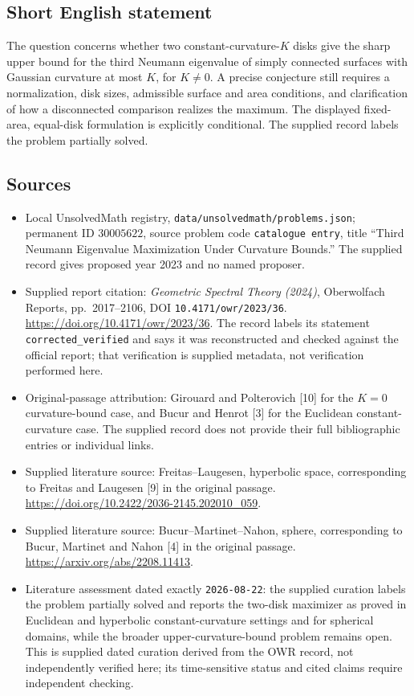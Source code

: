 \documentclass[11pt]{article}
\begin{document}
\subsection{Short English statement}
The question concerns whether two constant-curvature-\(K\) disks give the sharp upper bound for the third Neumann eigenvalue of simply connected surfaces with Gaussian curvature at most \(K\), for \(K\neq0\). A precise conjecture still requires a normalization, disk sizes, admissible surface and area conditions, and clarification of how a disconnected comparison realizes the maximum. The displayed fixed-area, equal-disk formulation is explicitly conditional. The supplied record labels the problem partially solved.
\subsection{Sources}
\begin{itemize}
\item Local UnsolvedMath registry, \texttt{data/unsolvedmath/problems.json}; permanent ID \(30005622\), source problem code \texttt{catalogue entry}, title ``Third Neumann Eigenvalue Maximization Under Curvature Bounds.'' The supplied record gives proposed year 2023 and no named proposer.
\item Supplied report citation: \emph{Geometric Spectral Theory (2024)}, Oberwolfach Reports, pp.\ 2017--2106, DOI \texttt{10.4171/owr/2023/36}. \url{https://doi.org/10.4171/owr/2023/36}. The record labels its statement \texttt{corrected\_verified} and says it was reconstructed and checked against the official report; that verification is supplied metadata, not verification performed here.
\item Original-passage attribution: Girouard and Polterovich [10] for the \(K=0\) curvature-bound case, and Bucur and Henrot [3] for the Euclidean constant-curvature case. The supplied record does not provide their full bibliographic entries or individual links.
\item Supplied literature source: Freitas--Laugesen, hyperbolic space, corresponding to Freitas and Laugesen [9] in the original passage. \url{https://doi.org/10.2422/2036-2145.202010_059}.
\item Supplied literature source: Bucur--Martinet--Nahon, sphere, corresponding to Bucur, Martinet and Nahon [4] in the original passage. \url{https://arxiv.org/abs/2208.11413}.
\item Literature assessment dated exactly \texttt{2026-08-22}: the supplied curation labels the problem partially solved and reports the two-disk maximizer as proved in Euclidean and hyperbolic constant-curvature settings and for spherical domains, while the broader upper-curvature-bound problem remains open. This is supplied dated curation derived from the OWR record, not independently verified here; its time-sensitive status and cited claims require independent checking.
\end{itemize}
\end{document}
